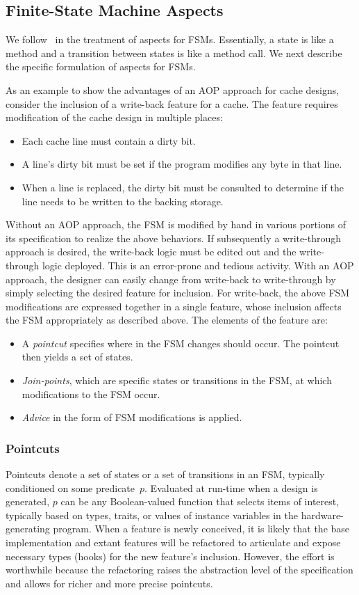 \documentclass[conference]{IEEEtran}
\begin{document}
\subsection{Finite-State Machine Aspects}
We follow~\cite{aspectsUML} in the treatment of aspects for FSMs. Essentially, a state is like a method and a transition between states is like a method call.  We next describe the specific formulation of aspects for FSMs.  

As an example to show the advantages of an AOP approach for cache designs, consider the inclusion of a write-back feature for a cache. The feature requires modification of the cache design in multiple places:
\begin{itemize}
    \item Each cache line must contain a dirty bit.
    \item A line's dirty bit must be set if the program modifies any byte in that line.
    \item When a line is replaced, the dirty bit must be consulted to determine if the line needs to be written to the backing storage.
\end{itemize}
Without an AOP approach, the FSM is modified by hand in various portions of its specification to realize the above behaviors.   If subsequently a write-through approach is desired, the write-back logic must be edited out and the write-through logic deployed.  This is an error-prone and tedious activity.
With an AOP approach, the designer can easily change from write-back to write-through by simply selecting the desired feature for inclusion.  For write-back, the above FSM modifications are expressed together in a single feature, whose inclusion affects the FSM appropriately as described above.  The elements of the feature are:
\begin{itemize}
    \item A \emph{pointcut} specifies where in the FSM changes should occur.  The pointcut then yields a set of states.
    \item \emph{Join-points}, which are specific states or transitions in the FSM, at which modifications to the FSM occur.
    \item \emph{Advice} in the form of FSM modifications is applied.
\end{itemize}

\subsubsection{Pointcuts}
Pointcuts denote a set of states or a set of transitions in an FSM, typically conditioned on some predicate~$p$.
Evaluated at run-time when a design is generated, $p$ can be any Boolean-valued function that selects items of interest, typically based on types, traits, or values of instance variables in the hardware-generating program.  When a feature is newly conceived, it is likely that the base implementation and extant features will be refactored to articulate and expose necessary types (hooks) for the new feature's inclusion. However, the effort is worthwhile because the refactoring raises the abstraction level of the specification and allows for richer and more precise pointcuts.
\end{document}
